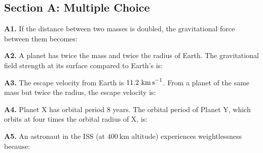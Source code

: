 \newpage
\begin{exercisebox}[8]

\subsection*{Section A: Multiple Choice}

\textbf{A1.} If the distance between two masses is
doubled, the gravitational force between them becomes:


\vspace{0.4cm}

\textbf{A2.} A planet has twice the mass and twice
the radius of Earth. The gravitational field strength
at its surface compared to Earth's is:


\vspace{0.4cm}

\textbf{A3.} The escape velocity from Earth is
$11.2\ \text{km\,s}^{-1}$. From a planet of the same
mass but twice the radius, the escape velocity is:


\vspace{0.4cm}

\textbf{A4.} Planet X has orbital period $8$ years.
The orbital period of Planet Y, which orbits at four
times the orbital radius of X, is:


\vspace{0.4cm}

\textbf{A5.} An astronaut in the ISS (at $400\ \text{km}$
altitude) experiences weightlessness because:



\end{exercisebox}
